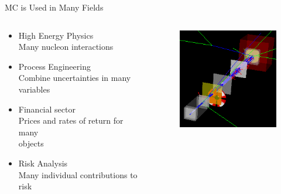 \documentclass[xcolor=x11names,compress]{beamer}
\renewcommand{\(}{\begin{columns}}
\renewcommand{\)}{\end{columns}}
\newcommand{\<}[1]{\begin{column}{#1}}
\renewcommand{\>}{\end{column}}
\begin{document}
\begin{frame}{MC is Used in Many Fields}

\begin{columns}
  \begin{column}{0.6\textwidth}
  \begin{itemize}
\item High Energy Physics \\
\hspace*{1em} Many nucleon interactions
\item Process Engineering \\
\hspace*{1em} Combine uncertainties in many\\
\hspace*{1em} variables
\item Financial sector \\
\hspace*{1em} Prices and rates of return for many \\
\hspace*{1em}objects
\item Risk Analysis \\
\hspace*{1em} Many individual contributions to \\
\hspace*{1em}risk
\end{itemize}
  \end{column}
  \begin{column}{0.4\textwidth}
  	\begin{figure}
  	\begin{center}
  		\includegraphics[height=1.75in,clip]{cco-beam}
	\end{center}
  	\end{figure}
  \end{column}
\end{columns}

\end{frame}
\end{document}
